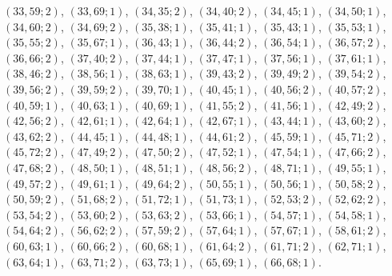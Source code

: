 \documentclass[11pt]{article}
\begin{document}
$(33,59;2)$, $(33,69;1)$, $(34,35;2)$, $(34,40;2)$, $(34,45;1)$, $(34,50;1)$, $(34,60;2)$, $(34,69;2)$, $(35,38;1)$, $(35,41;1)$, $(35,43;1)$, $(35,53;1)$, $(35,55;2)$, $(35,67;1)$, $(36,43;1)$, $(36,44;2)$, $(36,54;1)$, $(36,57;2)$, $(36,66;2)$, $(37,40;2)$, $(37,44;1)$, $(37,47;1)$, $(37,56;1)$, $(37,61;1)$, $(38,46;2)$, $(38,56;1)$, $(38,63;1)$, $(39,43;2)$, $(39,49;2)$, $(39,54;2)$, $(39,56;2)$, $(39,59;2)$, $(39,70;1)$, $(40,45;1)$, $(40,56;2)$, $(40,57;2)$, $(40,59;1)$, $(40,63;1)$, $(40,69;1)$, $(41,55;2)$, $(41,56;1)$, $(42,49;2)$, $(42,56;2)$, $(42,61;1)$, $(42,64;1)$, $(42,67;1)$, $(43,44;1)$, $(43,60;2)$, $(43,62;2)$, $(44,45;1)$, $(44,48;1)$, $(44,61;2)$, $(45,59;1)$, $(45,71;2)$, $(45,72;2)$, $(47,49;2)$, $(47,50;2)$, $(47,52;1)$, $(47,54;1)$, $(47,66;2)$, $(47,68;2)$, $(48,50;1)$, $(48,51;1)$, $(48,56;2)$, $(48,71;1)$, $(49,55;1)$, $(49,57;2)$, $(49,61;1)$, $(49,64;2)$, $(50,55;1)$, $(50,56;1)$, $(50,58;2)$, $(50,59;2)$, $(51,68;2)$, $(51,72;1)$, $(51,73;1)$, $(52,53;2)$, $(52,62;2)$, $(53,54;2)$, $(53,60;2)$, $(53,63;2)$, $(53,66;1)$, $(54,57;1)$, $(54,58;1)$, $(54,64;2)$, $(56,62;2)$, $(57,59;2)$, $(57,64;1)$, $(57,67;1)$, $(58,61;2)$, $(60,63;1)$, $(60,66;2)$, $(60,68;1)$, $(61,64;2)$, $(61,71;2)$, $(62,71;1)$, $(63,64;1)$, $(63,71;2)$, $(63,73;1)$, $(65,69;1)$, $(66,68;1)$.
\end{document}
